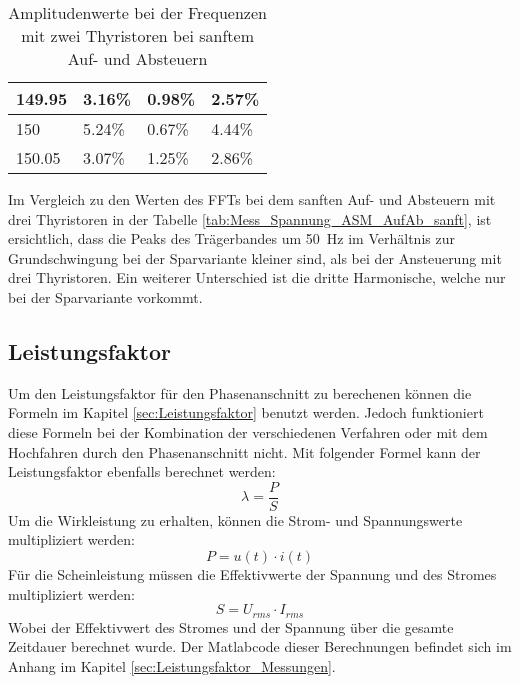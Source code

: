 \begin{table}[ht!]
\begin{tabular}{|l|l|l|l|}
		149.95            & 3.16\%                                                                              & 0.98\%                                                                              & 2.57\%                                                                              \\ \hline
		150               & 5.24\%                                                                              & 0.67\%                                                                              & 4.44\%                                                                              \\ \hline
		150.05            & 3.07\%                                                                              & 1.25\%                                                                              & 2.86\%                                                                              \\ \hline
	\end{tabular}
\caption{Amplitudenwerte bei der Frequenzen mit zwei Thyristoren bei sanftem Auf- und Absteuern}\label{tab:Mess_2Thyristoren_Spannung_ASM_AufAb_sanft}
\end{table}

Im Vergleich zu den Werten des FFTs bei dem sanften Auf- und Absteuern mit drei Thyristoren in der Tabelle \ref{tab:Mess_Spannung_ASM_AufAb_sanft}, ist ersichtlich, dass die Peaks des Trägerbandes um \SI{50}{Hz} im Verhältnis zur Grundschwingung bei der Sparvariante kleiner sind, als bei der Ansteuerung mit drei Thyristoren. Ein weiterer Unterschied ist die dritte Harmonische, welche nur bei der Sparvariante vorkommt. 


\newpage
\subsection{Leistungsfaktor}
Um den Leistungsfaktor für den Phasenanschnitt zu berechenen können die Formeln im Kapitel \ref{sec:Leistungsfaktor} benutzt werden. Jedoch funktioniert diese Formeln bei der Kombination der verschiedenen Verfahren oder mit dem Hochfahren durch den Phasenanschnitt nicht. Mit folgender Formel kann der Leistungsfaktor ebenfalls berechnet werden:
\begin{equation}
\lambda = \frac{P}{S}
\end{equation}
Um die Wirkleistung zu erhalten, können die Strom- und Spannungswerte multipliziert werden:
\begin{equation}
P = u(t) \cdot i(t)
\end{equation}
Für die Scheinleistung müssen die Effektivwerte der Spannung und des Stromes multipliziert werden:
\begin{equation}
S = U_{rms} \cdot I_{rms}
\end{equation}
Wobei der Effektivwert des Stromes und der Spannung über die gesamte Zeitdauer berechnet wurde. Der Matlabcode dieser Berechnungen befindet sich im Anhang im Kapitel \ref{sec:Leistungsfaktor_Messungen}. 

